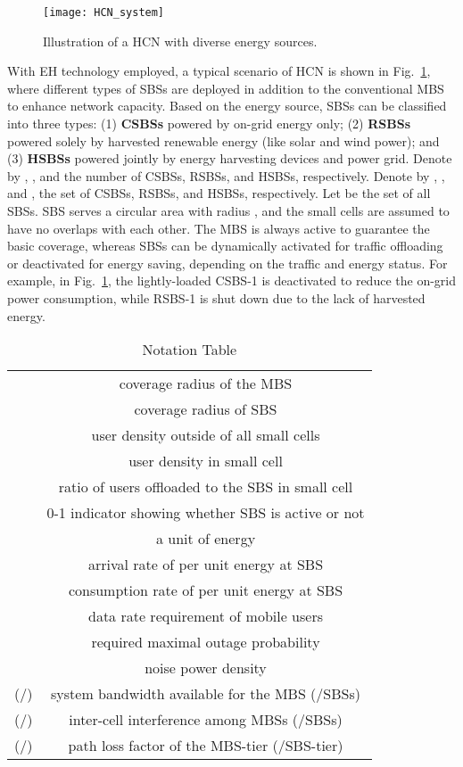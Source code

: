 \documentclass[12pt, draftclsnofoot,onecolumn]{IEEEtran}
\begin{document}
\begin{figure}
  \centering
  \texttt{[image: HCN\_system]}\\
  \caption{Illustration of a HCN with diverse energy sources.}\label{fig_HCN}
\end{figure}

With EH technology employed, a typical scenario of HCN is shown in Fig.~\ref{fig_HCN}, where different types of SBSs are deployed in addition to the conventional MBS to enhance network capacity.
Based on the energy source, SBSs can be classified into three types: (1) \textbf{CSBSs} powered by on-grid energy only; (2) \textbf{RSBSs} powered solely by harvested renewable energy (like solar and wind power); and (3) \textbf{HSBSs} powered jointly by energy harvesting devices and power grid.
Denote by , , and  the number of CSBSs, RSBSs, and HSBSs, respectively.
Denote by , , and , the set of CSBSs, RSBSs, and HSBSs, respectively.
Let  be the set of all SBSs. 
SBS serves a circular area with radius , and the small cells are assumed to have no overlaps with each other.
The MBS is always active to guarantee the basic coverage, whereas SBSs can be dynamically activated for traffic offloading or deactivated for energy saving, depending on the traffic and energy status.
For example, in Fig.~\ref{fig_HCN}, the lightly-loaded CSBS-1 is deactivated to reduce the on-grid power consumption, while RSBS-1 is shut down due to the lack of harvested energy.

\begin{table}
\center
\caption{Notation Table}
\begin{tabular}{c|c}
  \hline
  \hline
   & coverage radius of the MBS\\  
   & coverage radius of SBS\\
   & user density outside of all small cells\\
   & user density in small cell \\
   & ratio of users offloaded to the SBS in small cell \\
   & 0-1 indicator showing whether SBS is active or not\\
   & a unit of energy\\
   & arrival rate of per unit energy at SBS\\
   & consumption rate of per unit energy at SBS\\
   & data rate requirement of mobile users\\
   & required maximal outage probability\\
   & noise power density\\
   (/) & system bandwidth available for the MBS (/SBSs)\\
   (/) & inter-cell interference among MBSs (/SBSs)\\
   (/) & path loss factor of the MBS-tier (/SBS-tier)\\
  \hline
  \hline
\end{tabular}
\label{tab_P_BS}
\end{table}
\end{document}
